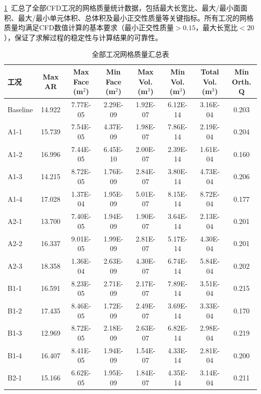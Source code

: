 \label{sec:appendix-mesh-quality}


\cref{tab:appendix-mesh}~汇总了全部CFD工况的网格质量统计数据，包括最大长宽比、最大/最小面面积、最大/最小单元体积、总体积及最小正交性质量等关键指标。所有工况的网格质量均满足CFD数值计算的基本要求（最小正交性质量$>0.15$，最大长宽比$<20$），保证了求解过程的稳定性与计算结果的可靠性。

\begin{table}[!htb]
  \caption{全部工况网格质量汇总表}\label{tab:appendix-mesh}
  \centering
  \begin{tabular}{@{}lccccccc@{}}
    \toprule
    工况 & Max AR & Max Face (m$^2$) & Min Face (m$^2$) & Max Vol. (m$^3$) & Min Vol. (m$^3$) & Total Vol. (m$^3$) & Min Orth. Q \\
    \midrule
    Baseline     & 14.922 & 7.77E-05 & 2.29E-09 & 1.92E-07 & 6.12E-14 & 3.16E-04 & 0.203 \\
    A1-1         & 15.739 & 7.54E-05 & 4.37E-09 & 1.98E-07 & 7.86E-14 & 2.19E-04 & 0.204 \\
    A1-2         & 16.996 & 7.44E-05 & 6.45E-10 & 2.00E-07 & 2.39E-14 & 1.61E-04 & 0.160 \\
    A1-3         & 14.215 & 8.72E-05 & 1.76E-09 & 2.84E-07 & 3.80E-14 & 4.73E-04 & 0.206 \\
    A1-4         & 17.028 & 1.37E-04 & 1.95E-09 & 5.01E-07 & 8.15E-14 & 8.72E-04 & 0.177 \\
    A2-1         & 13.700 & 7.40E-05 & 1.94E-09 & 1.90E-07 & 3.64E-14 & 2.13E-04 & 0.201 \\
    A2-2         & 16.337 & 9.01E-05 & 1.99E-09 & 2.81E-07 & 5.17E-14 & 4.30E-04 & 0.201 \\
    A2-3         & 18.358 & 1.36E-04 & 2.63E-09 & 4.30E-07 & 6.74E-14 & 5.84E-04 & 0.202 \\
    B1-1         & 16.591 & 8.23E-05 & 2.71E-09 & 2.17E-07 & 7.89E-14 & 3.51E-04 & 0.215 \\
    B1-2         & 17.435 & 8.46E-05 & 1.72E-09 & 2.49E-07 & 3.69E-14 & 3.33E-04 & 0.170 \\
    B1-3         & 12.969 & 8.72E-05 & 2.18E-09 & 2.63E-07 & 6.82E-14 & 2.98E-04 & 0.219 \\
    B1-4         & 16.407 & 8.41E-05 & 1.94E-09 & 1.54E-07 & 4.33E-14 & 2.81E-04 & 0.200 \\
    B2-1         & 15.166 & 6.62E-05 & 1.95E-09 & 1.84E-07 & 4.35E-14 & 3.14E-04 & 0.211 \\

\end{tabular}
\end{table}
